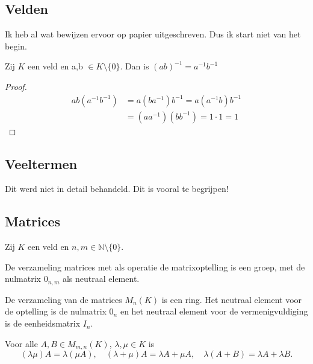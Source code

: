 \subsection{Velden}

Ik heb al wat bewijzen ervoor op papier uitgeschreven. Dus ik start niet van het begin.

\begin{lemma}[ 1.1.8 (ix)]
    Zij \(K\) een veld en a,b \(\in K \setminus \{0\}\). Dan is \((ab)^{-1} = a^{-1} b^{-1}\)
\end{lemma}
\begin{proof}
    \begin{align*}
        ab(a^{-1} b^{-1}) &= a(ba^{-1})b^{-1} 
        = a(a^{-1}b)b^{-1} \\
        &= (aa^{-1})(bb^{-1}) 
        = 1 \cdot 1 
        = 1
    \end{align*}
\end{proof}

\subsection{Veeltermen}

Dit werd niet in detail behandeld. Dit is vooral te begrijpen!

\subsection{Matrices}

Zij \(K\) een veld en \(n,m \in \mathds{N} \setminus \{0\}.\)

\begin{lemma}[i]
    
    De verzameling matrices met als operatie de matrixoptelling is een groep,
    met de nulmatrix \(0_{n,m}\) als neutraal element.
\end{lemma}

\begin{lemma}[ii]
    De verzameling van de matrices $M_n(K)$ is een ring. Het neutraal element voor de optelling is de nulmatrix $0_n$ en het neutraal element voor de vermenigvuldiging is de eenheidsmatrix $I_n$.
\end{lemma}

\begin{lemma}[iii]
    Voor alle $A, B \in M_{m,n}(K)$, $\lambda, \mu \in K$ is
    \[ (\lambda\mu)A = \lambda(\mu A), \quad (\lambda + \mu)A = \lambda A + \mu A, \quad \lambda(A + B) = \lambda A + \lambda B. \]
\end{lemma}

